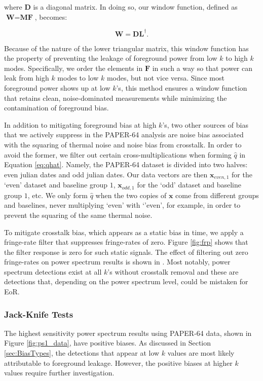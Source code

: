 \documentclass[preprint2,numberedappendix,tighten]{aastex6}  %
\begin{document}
\noindent where $\textbf{D}$ is a diagonal matrix. In doing so, our window function, defined as $\textbf{W} = \textbf{MF}$, becomes:

\begin{equation}
\textbf{W} = \textbf{DL}^{\dagger}.
\end{equation}

\noindent Because of the nature of the lower triangular matrix, this window function has the property of preventing the leakage of foreground power from low $k$ to high $k$ modes. Specifically, we order the elements in $\textbf{F}$ in such a way so that power can leak from high $k$ modes to low $k$ modes, but not vice versa. Since most foreground power shows up at low $k$'s, this method ensures a window function that retains clean, noise-dominated measurements while minimizing the contamination of foreground bias.

In addition to mitigating foreground bias at high $k$'s, two other sources of bias that we actively suppress in the PAPER-64 analysis are noise bias associated with the squaring of thermal noise and noise bias from crosstalk. In order to avoid the former, we filter out certain cross-multiplications when forming $\hat{q}$ in Equation \ref{eq:qhat}. Namely, the PAPER-64 dataset is divided into two halves: even julian dates and odd julian dates. Our data vectors are then $\textbf{x}_{even, 1}$ for the `even' dataset and baseline group $1$, $\textbf{x}_{odd, 1}$ for the `odd' dataset and baseline group $1$, etc. We only form $\hat{q}$ when the two copies of $\textbf{x}$ come from different groups and baselines, never multiplying `even' with `'even', for example, in order to prevent the squaring of the same thermal noise.

To mitigate crosstalk bias, which appears as a static bias in time, we apply a fringe-rate filter that suppresses fringe-rates of zero. Figure \ref{fig:frp} shows that the filter response is zero for such static signals. The effect of filtering out zero fringe-rates on power spectrum results is shown in \citet{ali_et_al2015}. Most notably, power spectrum detections exist at all $k$'s without crosstalk removal and these are detections that, depending on the power spectrum level, could be mistaken for EoR. 

\subsubsection{Jack-Knife Tests}

The highest sensitivity power spectrum results using PAPER-64 data, shown in Figure \ref{fig:ps1_data}, have positive biases. As discussed in Section \ref{sec:BiasTypes}, the detections that appear at low $k$ values are most likely attributable to foreground leakage. However, the positive biases at higher $k$ values require further investigation. 
\end{document}
